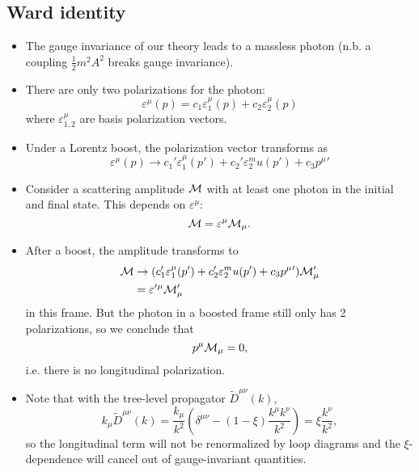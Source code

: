 \subsection*{Ward identity}
\begin{itemize}
    \item The gauge invariance of our theory leads to a massless photon (n.b. a coupling $\frac{1}{2}m^2 A^2$ breaks gauge invariance).
    \item There are only two polarizations for the photon:
    \begin{equation}
        \varepsilon^\mu(p)=c_1 \varepsilon_1^\mu(p)+c_2 \varepsilon_2^\mu(p)
    \end{equation}
    where $\varepsilon^\mu_{1,2}$ are basis polarization vectors.
    \item Under a Lorentz boost, the polarization vector transforms as
    \begin{equation}
        \varepsilon^\mu(p)\to c_1' \varepsilon_1^\mu(p')+c_2' \varepsilon_2^mu(p')+c_3 p^\mu{}'
    \end{equation}
    \item Consider a scattering amplitude $\mathcal{M}$ with at least one photon in the initial and final state. This depends on $\varepsilon^\mu$:
    \begin{equation*}
        \mathcal{M} = \varepsilon^\mu \mathcal{M}_\mu.
    \end{equation*}
    \item After a boost, the amplitude transforms to
    \begin{align*}
        \mathcal{M} &\to (c_1' \varepsilon_1^\mu(p')+c_2' \varepsilon_2^mu(p')+c_3 p^\mu{}')\mathcal{M}_\mu'\\
        &= \varepsilon'{}^\mu \mathcal{M}_\mu'
    \end{align*}
    in this frame. But the photon in a boosted frame still only has 2 polarizations, so we conclude that 
    \begin{equation}
        p^\mu \mathcal{M}_\mu=0,
    \end{equation} 
    i.e. there is no longitudinal polarization.
    \item Note that with the tree-level propagator $\tilde D^{\mu\nu}(k)$,
    \begin{equation}
        k_\mu \tilde D^{\mu\nu}(k)=
        \frac{k_\mu}{k^2}(\delta^{\mu\nu}-(1-\xi)\frac{k^\mu k^\nu}{k^2})=\xi \frac{k^\nu}{k^2},
    \end{equation}
    so the longitudinal term will not be renormalized by loop diagrams and the $\xi$-dependence will cancel out of gauge-invariant quantities.
\end{itemize}